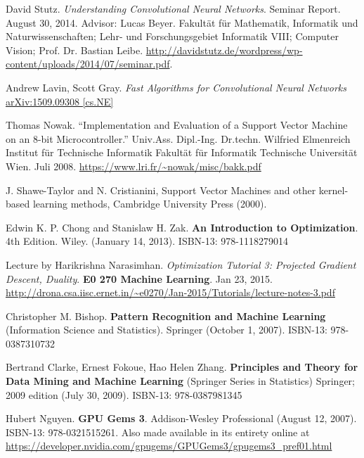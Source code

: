 \documentclass[10pt]{amsart}
\begin{document}
\begin{thebibliography}{9}
David Stutz.  \emph{Understanding Convolutional Neural Networks}.  Seminar Report.  August 30, 2014.  Advisor: Lucas Beyer.  Fakultät für Mathematik, Informatik und Naturwissenschaften; Lehr- und Forschungsgebiet Informatik VIII; Computer Vision; Prof. Dr. Bastian Leibe.  \url{http://davidstutz.de/wordpress/wp-content/uploads/2014/07/seminar.pdf}.  

Andrew Lavin, Scott Gray.  \emph{Fast Algorithms for Convolutional Neural Networks} \href{https://arxiv.org/abs/1509.09308}{arXiv:1509.09308 [cs.NE]}





Thomas Nowak.  ``Implementation and Evaluation of a Support Vector Machine on an 8-bit Microcontroller.''  Univ.Ass. Dipl.-Ing. Dr.techn. Wilfried Elmenreich Institut f\"{u}r Technische Informatik Fakult\"{a}t f\"{u}r Informatik Technische Universit\"{a}t Wien.  Juli 2008.  \url{https://www.lri.fr/~nowak/misc/bakk.pdf}



J.  Shawe-Taylor  and  N.  Cristianini,  Support  Vector  Machines  and  other  kernel-based  learning  methods,
Cambridge University Press (2000).



Edwin K. P. Chong and Stanislaw H. Zak.  \textbf{An Introduction to Optimization}.  4th Edition.  Wiley.  (January 14, 2013).  ISBN-13: 978-1118279014
  
Lecture by Harikrishna Narasimhan.  \emph{Optimization Tutorial 3: Projected Gradient Descent, Duality}.  \textbf{E0 270 Machine Learning}.  Jan 23, 2015.  \url{http://drona.csa.iisc.ernet.in/~e0270/Jan-2015/Tutorials/lecture-notes-3.pdf}

Christopher M. Bishop.  \textbf{Pattern Recognition and Machine Learning} (Information Science and Statistics).  Springer (October 1, 2007).  ISBN-13: 978-0387310732


Bertrand Clarke, Ernest Fokoue, Hao Helen Zhang.   \textbf{Principles and Theory for Data Mining and Machine Learning} (Springer Series in Statistics)  Springer; 2009 edition (July 30, 2009).  ISBN-13: 978-0387981345
 

Hubert Nguyen. \textbf{GPU Gems 3}.  Addison-Wesley Professional (August 12, 2007).  ISBN-13: 978-0321515261.  Also made available in its entirety online at \url{https://developer.nvidia.com/gpugems/GPUGems3/gpugems3_pref01.html}


\end{thebibliography}
\end{document}
